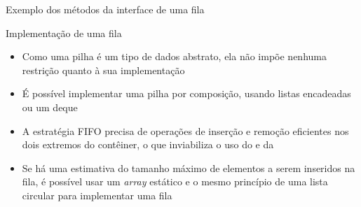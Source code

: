 \begin{frame}[fragile]{Exemplo dos métodos da interface de uma fila}


\end{frame}

\begin{frame}[fragile]{Implementação de uma fila}

    \begin{itemize}
        \item Como uma pilha é um tipo de dados abstrato, ela não impõe nenhuma restrição
            quanto à sua implementação

        \item É possível implementar uma pilha por composição, usando listas encadeadas ou um
            deque

        \item A estratégia FIFO precisa de operações de inserção e remoção eficientes nos
            dois extremos do contêiner, o que inviabiliza o uso do  e da

        \item Se há uma estimativa do tamanho máximo de elementos a serem inseridos na fila,
            é possível usar um \textit{array} estático e o mesmo princípio de uma lista circular 
            para implementar uma fila
    \end{itemize}

\end{frame}

